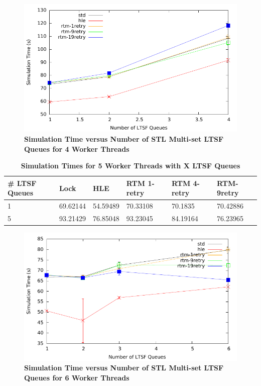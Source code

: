 \documentclass[11pt]{book}
\begin{document}
\begin{figure}[H]
    \centering
    \graphicspath{ {./figures/} }
    \includegraphics[width=\textwidth,height=\textheight,keepaspectratio]{noThrMig-hugeEpidemicSim-timeVSschedQs-multiset-4thread}
    \caption{\textbf{Simulation Time versus Number of STL Multi-set LTSF Queues
    for 4 Worker Threads}}
    \label{fig:noThrMig_timeVSschq_4threads}
\end{figure}

\begin{table}[H]
    \centering
    \begin{tabular}{l|p{2cm}|p{2cm}|p{2cm}|p{2cm}|p{2cm}}
        \textbf{\# LTSF Queues}&Lock &HLE &RTM 1-retry &RTM 4-retry &RTM-9retry \\
        \hline
        \midrule
            1 &69.62144  &54.59489 &70.33108  &70.1835  &70.42886 \\ 
            5 &93.21429  &76.85048 &93.23045  &84.19164 &76.23965 \\
    \end{tabular}
    \caption{\textbf{Simulation Times for 5 Worker Threads with X LTSF Queues}}
    \label{tab:noThrMig_5threadsXschq}
\end{table}

\begin{figure}[H]
    \centering
    \graphicspath{ {./figures/} }
    \includegraphics[width=\textwidth,height=\textheight,keepaspectratio]{noThrMig-hugeEpidemicSim-timeVSschedQs-multiset-6thread}
    \caption{\textbf{Simulation Time versus Number of STL Multi-set LTSF Queues
    for 6 Worker Threads}}
    \label{fig:noThrMig_timeVSschq_6threads}
\end{figure}
\end{document}
